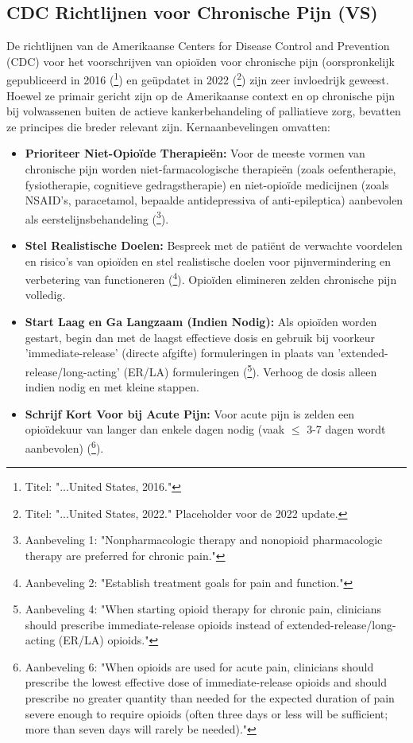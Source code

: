 \documentclass[11pt, a4paper]{report} %
\begin{document}
\subsection{CDC Richtlijnen voor Chronische Pijn (VS)}
De richtlijnen van de Amerikaanse Centers for Disease Control and Prevention (CDC) voor het voorschrijven van opioïden voor chronische pijn (oorspronkelijk gepubliceerd in 2016 (\cite{Dowell2016CDCGuideline}\footnote{Titel: "...United States, 2016."}) en geüpdatet in 2022 (\cite{Dowell2022CDCGuidelineUpdate}\footnote{Titel: "...United States, 2022." Placeholder voor de 2022 update.}) zijn zeer invloedrijk geweest. Hoewel ze primair gericht zijn op de Amerikaanse context en op chronische pijn bij volwassenen buiten de actieve kankerbehandeling of palliatieve zorg, bevatten ze principes die breder relevant zijn. Kernaanbevelingen omvatten:
\begin{itemize}
    \item \textbf{Prioriteer Niet-Opioïde Therapieën:} Voor de meeste vormen van chronische pijn worden niet-farmacologische therapieën (zoals oefentherapie, fysiotherapie, cognitieve gedragstherapie) en niet-opioïde medicijnen (zoals NSAID's, paracetamol, bepaalde antidepressiva of anti-epileptica) aanbevolen als eerstelijnsbehandeling (\cite{Dowell2016CDCGuideline}\footnote{Aanbeveling 1: "Nonpharmacologic therapy and nonopioid pharmacologic therapy are preferred for chronic pain."}).
    \item \textbf{Stel Realistische Doelen:} Bespreek met de patiënt de verwachte voordelen en risico's van opioïden en stel realistische doelen voor pijnvermindering en verbetering van functioneren (\cite{Dowell2016CDCGuideline}\footnote{Aanbeveling 2: "Establish treatment goals for pain and function."}). Opioïden elimineren zelden chronische pijn volledig.
    \item \textbf{Start Laag en Ga Langzaam (Indien Nodig):} Als opioïden worden gestart, begin dan met de laagst effectieve dosis en gebruik bij voorkeur 'immediate-release' (directe afgifte) formuleringen in plaats van 'extended-release/long-acting' (ER/LA) formuleringen (\cite{Dowell2016CDCGuideline}\footnote{Aanbeveling 4: "When starting opioid therapy for chronic pain, clinicians should prescribe immediate-release opioids instead of extended-release/long-acting (ER/LA) opioids."}). Verhoog de dosis alleen indien nodig en met kleine stappen.
    \item \textbf{Schrijf Kort Voor bij Acute Pijn:} Voor acute pijn is zelden een opioïdekuur van langer dan enkele dagen nodig (vaak $\leq$ 3-7 dagen wordt aanbevolen) (\cite{Dowell2016CDCGuideline}\footnote{Aanbeveling 6: "When opioids are used for acute pain, clinicians should prescribe the lowest effective dose of immediate-release opioids and should prescribe no greater quantity than needed for the expected duration of pain severe enough to require opioids (often three days or less will be sufficient; more than seven days will rarely be needed)."}).

\end{itemize}
\end{document}
